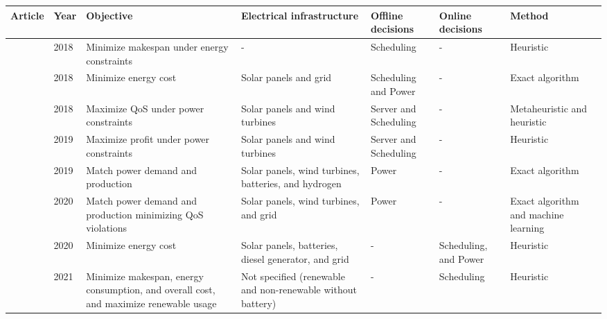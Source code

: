 \begin{landscape}
\begin{table*}[htp]
\centering
\begin{tabular}{m{3cm}|m{0.8cm}|m{3cm}|m{3.2cm}|m{3cm}|m{3cm}|m{3cm}}
\hline
Article & Year & Objective & Electrical infrastructure & Offline decisions & Online decisions & Method \\ \hline\hline
\citeauthor{hu2018schedule} \cite{hu2018schedule} & 2018 & Minimize makespan under energy constraints & - & Scheduling & - & Heuristic \\ \hline
\citeauthor{lu2018energy} \cite{lu2018energy} & 2018 & Minimize energy cost & Solar panels and grid & Scheduling and Power & - & Exact algorithm \\ \hline
\citeauthor{caux2018optimization} \cite{caux2018optimization} & 2018 & Maximize QoS under power constraints & Solar panels and wind turbines & Server and Scheduling & - & Metaheuristic and heuristic\\ \hline
\citeauthor{caux2019phase} \cite{caux2019phase} & 2019 & Maximize profit under power constraints & Solar panels and wind turbines & Server and Scheduling & - & Heuristic\\ \hline
\citeauthor{haddad2019mixed} \cite{haddad2019mixed} & 2019 & Match power demand and production & Solar panels, wind turbines, batteries, and hydrogen & Power & - & Exact algorithm \\ \hline
\citeauthor{gao2020smartly} \cite{gao2020smartly} & 2020 & Match power demand and production minimizing QoS violations & Solar panels, wind turbines, and grid & Power & - & Exact algorithm and machine learning \\ \hline
\citeauthor{haghshenas2020infrastructure} \cite{haghshenas2020infrastructure} & 2020 & Minimize energy cost & Solar panels, batteries, diesel generator, and grid & - & Scheduling, and Power & Heuristic \\ \hline
\citeauthor{nayak2021efficient} \cite{nayak2021efficient} & 2021 & Minimize makespan, energy consumption, and overall cost, and maximize renewable usage & Not specified (renewable and non-renewable without battery) & - & Scheduling & Heuristic \\ \hline
\end{tabular}
\end{table*}


\end{landscape}
